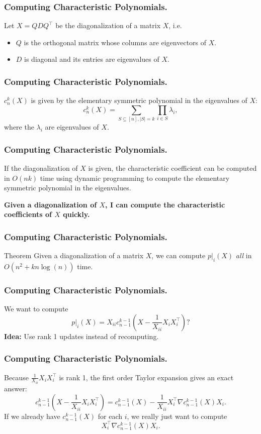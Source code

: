 \documentclass{beamer}
\begin{document}
\begin{frame}
    \frametitle{Computing Characteristic Polynomials.}
    Let $X = QDQ^{\intercal}$ be the diagonalization of a matrix $X$, i.e.
    \begin{itemize}
        \item $Q$ is the orthogonal matrix whose columns are eigenvectors of $X$.
        \item $D$ is diagonal and its entries are eigenvalues of $X$.
    \end{itemize}
\end{frame}
\begin{frame}
    \frametitle{Computing Characteristic Polynomials.}
    $c_n^k(X)$ is given by the elementary symmetric polynomial in the eigenvalues of $X$:
    \[
        c_n^k(X) = \sum_{S \subseteq [n],|S| = k} \prod_{i \in S}\lambda_i,
    \]
    where the $\lambda_i$ are eigenvalues of $X$.
\end{frame}
\begin{frame}
    \frametitle{Computing Characteristic Polynomials.}
    If the diagonalization of $X$ is given, the characteristic coefficient can be computed in $O(nk)$ time using dynamic programming to compute the elementary symmetric polynomial in the eigenvalues.

    \textbf{Given a diagonalization of $X$, I can compute the characteristic coefficients of $X$ quickly.}
\end{frame}
\begin{frame}
    \frametitle{Computing Characteristic Polynomials.}
    \begin{block}{Theorem}
        Given a diagonalization of a matrix $X$, we can compute $p|_i(X)$  \emph{all} in $O(n^2 + kn\log(n))$ time.
    \end{block}
\end{frame}
\begin{frame}
    \frametitle{Computing Characteristic Polynomials.}
    We want to compute
    \[
        p|_i(X) = X_{ii} c_{n-1}^{k-1}(X - \frac{1}{X_{ii}}X_iX_i^{\intercal})?
    \]
    \textbf{Idea: } Use rank 1 updates instead of recomputing.
\end{frame}
\begin{frame}
    \frametitle{Computing Characteristic Polynomials.}
    Because $\frac{1}{X_{ii}}X_iX_i^{\intercal}$ is rank 1, the first order Taylor expansion gives an exact answer:
    \[
        c_{n-1}^{k-1}(X - \frac{1}{X_{ii}}X_iX_i^{\intercal}) = c_{n-1}^{k-1}(X)  - \frac{1}{X_{ii}}X_i^{\intercal}\nabla c_{n-1}^{k-1}(X)X_i.
    \]
    If we already have $c_{n-1}^{k-1}(X)$ for each $i$, we really just want to compute
    \[
        X_i^{\intercal}\nabla c_{n-1}^{k-1}(X)X_i.
    \]
\end{frame}
\end{document}
